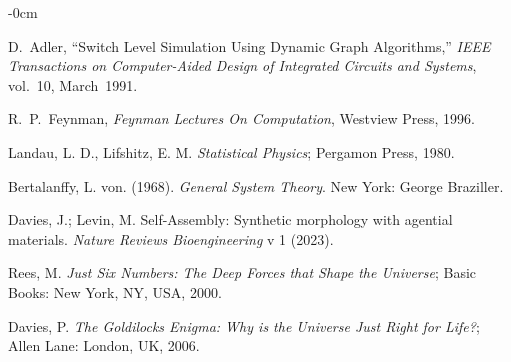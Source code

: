 \documentclass[entropy,article,submit,pdftex,moreauthors]{Definitions/mdpi}
\begin{document}
\begin{adjustwidth}{-\extralength}{0cm}
\begin{thebibliography}{999}
 D.~Adler, ``Switch Level Simulation Using Dynamic Graph Algorithms,''
{\em IEEE Transactions on Computer-Aided Design of Integrated Circuits and Systems}, vol.~10, March~1991.

R.~P.~Feynman, {\em Feynman Lectures On Computation}, Westview Press, 1996.

Landau, L. D., Lifshitz, E. M. \textit{Statistical Physics}; Pergamon Press, 1980.

Bertalanffy, L. von. (1968). \textit{General System Theory}. New York: George Braziller.

Davies, J.; Levin, M. Self-Assembly: Synthetic morphology with agential materials. \textit{Nature Reviews Bioengineering} v 1 (2023).

Rees, M. \textit{Just Six Numbers: The Deep Forces that Shape the Universe}; Basic Books: New York, NY, USA, 2000.

Davies, P. \textit{The Goldilocks Enigma: Why is the Universe Just Right for Life?}; Allen Lane: London, UK, 2006.


\end{thebibliography}

%


\PublishersNote{}
\end{adjustwidth}
\end{document}
